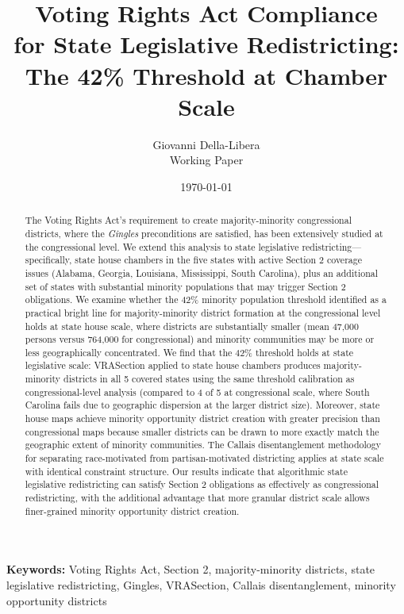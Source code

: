 \documentclass[12pt]{article}
\title{Voting Rights Act Compliance\\
for State Legislative Redistricting:\\
The 42\% Threshold at Chamber Scale}
\author{
Giovanni Della-Libera\\
\small{Working Paper}
}
\date{\today}
\begin{document}
\maketitle

\begin{abstract}
The Voting Rights Act's requirement to create majority-minority congressional districts, where the \textit{Gingles} preconditions are satisfied, has been extensively studied at the congressional level. We extend this analysis to state legislative redistricting---specifically, state house chambers in the five states with active Section 2 coverage issues (Alabama, Georgia, Louisiana, Mississippi, South Carolina), plus an additional set of states with substantial minority populations that may trigger Section 2 obligations. We examine whether the 42\% minority population threshold identified as a practical bright line for majority-minority district formation at the congressional level \citep{dellaLibera2026threshold} holds at state house scale, where districts are substantially smaller (mean 47,000 persons versus 764,000 for congressional) and minority communities may be more or less geographically concentrated. We find that the 42\% threshold holds at state legislative scale: VRASection applied to state house chambers produces majority-minority districts in all 5 covered states using the same threshold calibration as congressional-level analysis (compared to 4 of 5 at congressional scale, where South Carolina fails due to geographic dispersion at the larger district size). Moreover, state house maps achieve minority opportunity district creation with greater precision than congressional maps because smaller districts can be drawn to more exactly match the geographic extent of minority communities. The Callais disentanglement methodology for separating race-motivated from partisan-motivated districting applies at state scale with identical constraint structure. Our results indicate that algorithmic state legislative redistricting can satisfy Section 2 obligations as effectively as congressional redistricting, with the additional advantage that more granular district scale allows finer-grained minority opportunity district creation.
\end{abstract}

\noindent\textbf{Keywords:} Voting Rights Act, Section 2, majority-minority districts, state legislative redistricting, Gingles, VRASection, Callais disentanglement, minority opportunity districts










\end{document}
